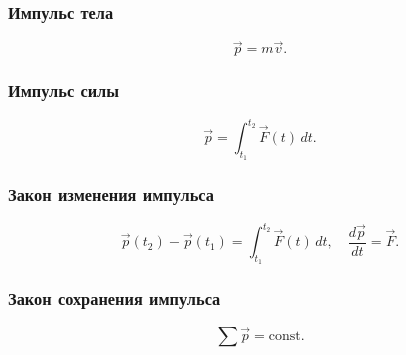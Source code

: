 \documentclass[12pt, a4paper]{article}
\begin{document}
\subsubsection*{Импульс тела}
\[
\vec p = m\vec v.
\]

\subsubsection*{Импульс силы}
\[
\vec p = \int_{t_1}^{t_2} \vec F(t)\,dt.
\]

\subsubsection*{Закон изменения импульса}
\[
\vec p(t_2) - \vec p(t_1) = \int_{t_1}^{t_2} \vec F(t)\,dt,
\quad
\frac{d\vec p}{dt} = \vec F.
\]

\subsubsection*{Закон сохранения импульса}
\[
\sum \vec p = \text{const}.
\]
\end{document}
